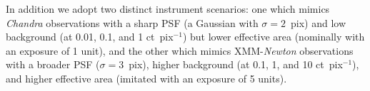 \documentclass[twocolumn]{aastex631}
\newcommand{\jolideco}{\textit{Jolideco}~}
\begin{document}
    In addition we adopt two distinct instrument scenarios: one which mimics \textit{Chandra} observations with a sharp PSF (a Gaussian with $\sigma=2$~pix) and low background (at 0.01, 0.1, and 1 ct~pix$^{-1}$) but lower effective area (nominally with an exposure of 1 unit), and the other which mimics XMM-\textit{Newton} observations with a broader PSF ($\sigma=3$~pix), higher background (at 0.1, 1, and 10 ct~pix$^{-1}$), and higher effective area (imitated with an exposure of 5 units).
    
    


    
\end{document}
